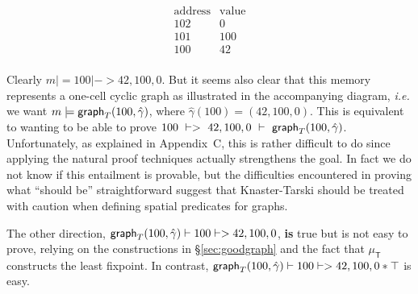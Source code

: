\documentclass[acmsmall,review,anonymous]{acmart}\settopmatter{printfolios=true,printccs=false,printacmref=false}
\newcommand\hide[1]{}
\begin{document}
\begin{wrapfigure}{r}{.39\textwidth}
\vspace{-2em} \begin{minipage}{.20\textwidth}
\qquad \[
\begin{array}{c|c}
\textrm{address} & \textrm{value} \\
\hline
102 & 0 \\
101 & 100 \\
100 & 42 \\
\end{array}
\]
\end{minipage}
\begin{minipage}{.19\textwidth}
\centering
\end{minipage}
\vspace{-0.5em} \end{wrapfigure}

\noindent Clearly $m |= 100 |-> 42,100,0$.  But it seems also clear that this memory represents a one-cell cyclic graph as illustrated in the accompanying diagram, \emph{i.e.} we want $m |= \mathsf{graph}_T(100,\hat{\gamma})$, where $\hat{\gamma}(100) = (42,100,0)$.  This is equivalent to wanting to be able to prove $100~|->~42,100,0~|-~\mathsf{graph}_T(100,\hat{\gamma})$.  Unfortunately, as explained in Appendix~C\hide{\ref{apx:problemrecgraph}}, this is rather difficult to do since applying the natural proof techniques actually strengthens the goal. In fact we do not know if this entailment is provable, but the difficulties encountered in proving what ``should be'' straightforward suggest that Knaster-Tarski should be treated with caution when defining spatial predicates for graphs.

The other direction, \mbox{$\mathsf{graph}_T(100,\hat{\gamma}) |- 100 |-> 42,100,0$},
\textbf{is} true but is not easy to prove, relying on the constructions in \S\ref{sec:goodgraph} and the fact that $\mu_{\mathsf{T}}$ constructs the least fixpoint.  In contrast, $\mathsf{graph}_T(100,\hat{\gamma}) |- 100 |-> 42,100,0 * \top$ is easy. 
\end{document}
